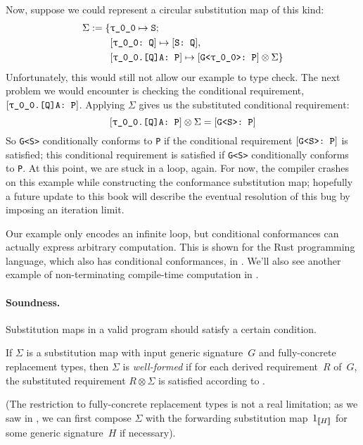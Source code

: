 \documentclass[../generics]{subfiles}
\begin{document}
Now, suppose we could represent a circular substitution map of this kind:
\begin{align*}
\Sigma := \SubstMapC{&\SubstType{\rT}{S}}{
\\
&\SubstConf{\rT}{S}{Q},\\
&\ConfReq{\rT.[Q]A}{P}\mapsto\ConfReq{G<\rT>}{P}\otimes\Sigma
}
\end{align*}
Unfortunately, this would still not allow our example to type check. The next problem we would encounter is checking the conditional requirement, $\ConfReq{\rT.[Q]A}{P}$. Applying $\Sigma$ gives us the substituted conditional requirement:
\[\ConfReq{\rT.[Q]A}{P}\otimes\Sigma=\ConfReq{G<S>}{P}\]
So \texttt{G<S>} conditionally conforms to \texttt{P} if the conditional requirement $[\texttt{G<S>:~P}]$ is satisfied; this conditional requirement is satisfied if \texttt{G<S>} conditionally conforms to \texttt{P}. At this point, we are stuck in a loop, again. For now, the compiler crashes on this example while constructing the conformance substitution map; hopefully a future update to this book will describe the eventual resolution of this bug by imposing an iteration limit.

Our example only encodes an infinite loop, but conditional conformances can actually express arbitrary computation. This is shown for the Rust programming language, which also has conditional conformances, in \cite{rustturing}. We'll also see another example of non-terminating compile-time computation in .

\paragraph{Soundness.}
Substitution maps in a valid program should satisfy a certain condition.
\begin{definition}\label{valid subst map}
If $\Sigma$ is a substitution map with input generic signature~$G$ and fully-concrete replacement types, then $\Sigma$ is \emph{well-formed} if for each derived requirement~$R$ of~$G$, the substituted requirement $R\otimes\Sigma$ is satisfied according to .
\end{definition}
(The restriction to fully-concrete replacement types is not a real limitation; as we saw in , we can first compose $\Sigma$ with the forwarding substitution map~$1_{[\![H]\!]}$ for some generic signature~$H$ if necessary).
\end{document}
